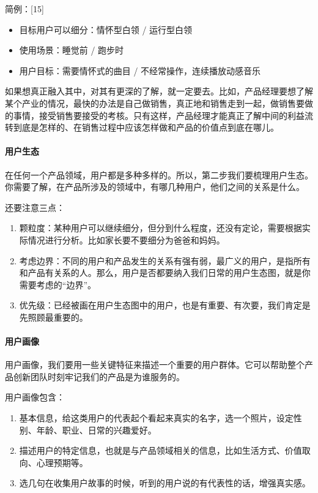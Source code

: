 \documentclass[letterpaper,10pt,english]{sphinxmanual}
\begin{document}
简例：{[}15{]}
\begin{itemize}
\item {} 
目标用户可以细分：情怀型白领 / 运行型白领

\item {} 
使用场景：睡觉前 / 跑步时

\item {} 
用户目标：需要情怀式的曲目 / 不经常操作，连续播放动感音乐

\end{itemize}

如果想真正融入其中，对其有更深的了解，就一定要去。比如，产品经理要想了解某个产业的情况，最快的办法是自己做销售，真正地和销售走到一起，做销售要做的事情，接受销售要接受的考核。只有这样，产品经理才能真正了解中间的利益流转到底是怎样的、在销售过程中应该怎样做和产品的价值点到底在哪儿。


\paragraph{用户生态}
\label{\detokenize{chapter_knowledge/users_analysis:id11}}
在任何一个产品领域，用户都是多种多样的。所以，第二步我们要梳理用户生态。你需要了解，在产品所涉及的领域中，有哪几种用户，他们之间的关系是什么。

还要注意三点：
\begin{enumerate}
%
\item {} 
颗粒度：某种用户可以继续细分，但分到什么程度，还没有定论，需要根据实际情况进行分析。比如家长要不要细分为爸爸和妈妈。

\item {} 
考虑边界：不同的用户和产品发生的关系有强有弱，最广义的用户，是指所有和产品有关系的人。那么，用户是否都要纳入我们日常的用户生态图，就是你需要考虑的“边界”。

\item {} 
优先级：已经被画在用户生态图中的用户，也是有重要、有次要，我们肯定是先照顾最重要的。

\end{enumerate}


\paragraph{用户画像}
\label{\detokenize{chapter_knowledge/users_analysis:id12}}
用户画像，我们要用一些关键特征来描述一个重要的用户群体。它可以帮助整个产品创新团队时刻牢记我们的产品是为谁服务的。

用户画像包含：
\begin{enumerate}
%
\item {} 
基本信息，给这类用户的代表起个看起来真实的名字，选一个照片，设定性别、年龄、职业、日常的兴趣爱好。

\item {} 
描述用户的特定信息，也就是与产品领域相关的信息，比如生活方式、价值取向、心理预期等。

\item {} 
选几句在收集用户故事的时候，听到的用户说的有代表性的话，增强真实感。

\end{enumerate}
\end{document}

